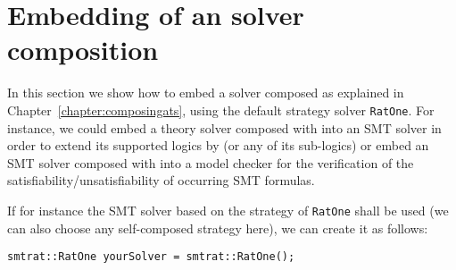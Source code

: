 \chapter{Embedding of an \smtrat solver composition}
\label{chapter:embedding}
In this section we show how to embed a solver composed as explained
in Chapter~\ref{chapter:composingats}, \eg using the default strategy
solver \texttt{RatOne}. For instance, we could embed a theory solver composed with \smtrat 
into an SMT solver in order to extend its supported logics by \supportedLogics (or any of its sub-logics) 
or embed an SMT solver composed with \smtrat into a model checker for the verification of the 
satisfiability/unsatisfiability of occurring SMT formulas. 

If for instance the SMT solver based on the strategy of \texttt{RatOne} shall be used (we can also choose any self-composed strategy here), we can create it as follows:
\begin{verbatim}
smtrat::RatOne yourSolver = smtrat::RatOne();
\end{verbatim}

